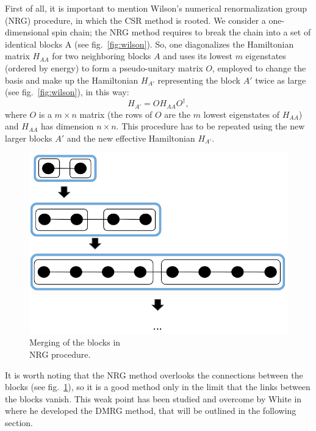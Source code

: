 First of all, it is important to mention Wilson's numerical renormalization group (NRG) procedure, in which the CSR method is rooted. We consider a one-dimensional spin chain;  the NRG method requires to break the chain into a set of identical blocks A (see fig.~\ref{fig:wilson}). So, one diagonalizes the Hamiltonian matrix $H_{AA}$ for two neighboring blocks $A$ and uses its lowest $m$ eigenstates (ordered by energy) to form a pseudo-unitary matrix $O$, employed to change the basis and make up the Hamiltonian $H_{A'}$ representing the block $A'$ twice as large (see fig.~\ref{fig:wilson}), in this way:
\begin{equation*}
    H_{A'} = OH_{AA}O^\dagger,
\end{equation*}
where $O$ is a $m\times n$ matrix (the rows of $O$ are the $m$ lowest eigenstates of $H_{AA}$) and $H_{AA}$ has dimension $n \times n$. This procedure has to be repeated using the new larger blocks $A'$ and the new effective Hamiltonian $H_{A'}$. 

\begin{figure}[H]
\centering
    \includegraphics[width=0.5\linewidth]{Figures/blocks_wilson}
    \caption{Merging of the blocks in \\NRG procedure.}
    \label{fig:blocks_wilson}
\end{figure}

It is worth noting that the NRG method overlooks the connections between the blocks (see fig.~\ref{fig:blocks_wilson}), so it is a good method only in the limit that the links between the blocks vanish. This weak point has been studied and overcome by White in~\cite{s_white:dmrg} where he developed the DMRG method, that will be outlined in the following section.

